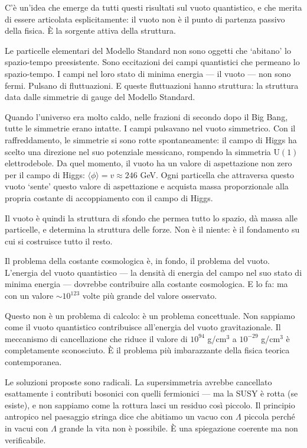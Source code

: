 \documentclass[12pt,a4paper,openany]{book}
\newcommand{\sezione}[1]{\vspace{1.2em}{\large\bfseries #1}\vspace{0.5em}\par}
\begin{document}
\sezione{Il vuoto come sorgente della struttura}

C'è un'idea che emerge da tutti questi risultati sul vuoto quantistico, e che merita di essere articolata esplicitamente: il vuoto non è il punto di partenza passivo della fisica. È la sorgente attiva della struttura.

Le particelle elementari del Modello Standard non sono oggetti che `abitano' lo spazio-tempo preesistente. Sono eccitazioni dei campi quantistici che permeano lo spazio-tempo. I campi nel loro stato di minima energia --- il vuoto --- non sono fermi. Pulsano di fluttuazioni. E queste fluttuazioni hanno struttura: la struttura data dalle simmetrie di gauge del Modello Standard.

Quando l'universo era molto caldo, nelle frazioni di secondo dopo il Big Bang, tutte le simmetrie erano intatte. I campi pulsavano nel vuoto simmetrico. Con il raffreddamento, le simmetrie si sono rotte spontaneamente: il campo di Higgs ha scelto una direzione nel suo potenziale messicano, rompendo la simmetria $\mathrm{U}(1)$ elettrodebole. Da quel momento, il vuoto ha un valore di aspettazione non zero per il campo di Higgs: $\langle\phi\rangle = v \approx 246$ GeV. Ogni particella che attraversa questo vuoto `sente' questo valore di aspettazione e acquista massa proporzionale alla propria costante di accoppiamento con il campo di Higgs.

Il vuoto è quindi la struttura di sfondo che permea tutto lo spazio, dà massa alle particelle, e determina la struttura delle forze. Non è il niente: è il fondamento su cui si costruisce tutto il resto.

\sezione{Il vuoto e l'energia oscura}

Il problema della costante cosmologica è, in fondo, il problema del vuoto. L'energia del vuoto quantistico --- la densità di energia del campo nel suo stato di minima energia --- dovrebbe contribuire alla costante cosmologica. E lo fa: ma con un valore $\sim 10^{123}$ volte più grande del valore osservato.

Questo non è un problema di calcolo: è un problema concettuale. Non sappiamo come il vuoto quantistico contribuisce all'energia del vuoto gravitazionale. Il meccanismo di cancellazione che riduce il valore di $10^{94}$ g/cm$^3$ a $10^{-29}$ g/cm$^3$ è completamente sconosciuto. È il problema più imbarazzante della fisica teorica contemporanea.

Le soluzioni proposte sono radicali. La supersimmetria avrebbe cancellato esattamente i contributi bosonici con quelli fermionici --- ma la SUSY è rotta (se esiste), e non sappiamo come la rottura lasci un residuo così piccolo. Il principio antropico nel paesaggio stringa dice che abitiamo un vacuo con $\Lambda$ piccola perché in vacui con $\Lambda$ grande la vita non è possibile. È una spiegazione coerente ma non verificabile.
\end{document}
